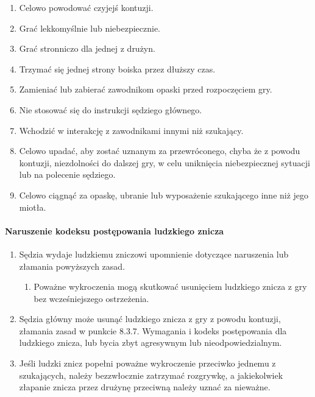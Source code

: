 \documentclass[12pt]{article}
\begin{document}
\begin{enumerate}
	\item Celowo powodować czyjejś kontuzji.

	\item Grać lekkomyślnie lub niebezpiecznie.

	\item Grać stronniczo dla jednej z drużyn.

	\item Trzymać się jednej strony boiska przez dłuższy czas.

	\item Zamieniać lub zabierać zawodnikom opaski przed rozpoczęciem gry.

	\item Nie stosować się do instrukcji sędziego głównego.

	\item Wchodzić w interakcję z zawodnikami innymi niż szukający.

	\item Celowo upadać, aby zostać uznanym za przewróconego, chyba że z powodu
	      kontuzji, niezdolności do dalszej gry, w celu uniknięcia niebezpiecznej
	      sytuacji lub na polecenie sędziego.

	\item Celowo ciągnąć za opaskę, ubranie lub wyposażenie szukającego inne
	      niż jego miotła.
\end{enumerate}

\paragraph{Naruszenie kodeksu postępowania ludzkiego znicza}

\begin{enumerate}
	\item Sędzia wydaje ludzkiemu zniczowi upomnienie dotyczące naruszenia lub
	      złamania powyższych zasad.
	      \begin{enumerate}
		      \item Poważne wykroczenia mogą skutkować usunięciem ludzkiego znicza z gry
		            bez wcześniejszego ostrzeżenia.
	      \end{enumerate}

	\item Sędzia główny może usunąć ludzkiego znicza z gry z powodu kontuzji,
	      złamania zasad w punkcie 8.3.7. Wymagania i kodeks postępowania dla
	      ludzkiego znicza, lub bycia zbyt agresywnym lub nieodpowiedzialnym.

	\item Jeśli ludzki znicz popełni poważne wykroczenie przeciwko jednemu z
	      szukających, należy bezzwłocznie zatrzymać rozgrywkę, a jakiekolwiek
	      złapanie znicza przez drużynę przeciwną należy uznać za nieważne.
\end{enumerate}
\end{document}
